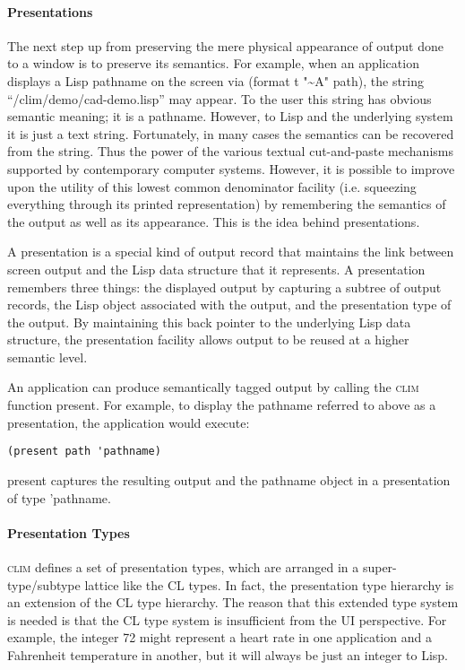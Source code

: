 \documentclass[twocolumn,a4paper]{article}
\newcommand {\code}[1]{{\sffamily #1}}
\newcommand {\CLIM}{\textsc{clim}}
\let\method\code
\begin{document}
\paragraph*{Presentations} The next step up from preserving the mere
physical appearance of output done to a window is to preserve its
semantics. For example, when an application displays a Lisp pathname
on the screen via \code{(format t "\~{}A" path)}, the string
``/clim/demo/cad-demo.lisp'' may appear. To the user this string has
obvious semantic meaning; it is a pathname. However, to Lisp and the
underlying system it is just a text string. Fortunately, in many cases
the semantics can be recovered from the string. Thus the power of the
various textual cut-and-paste mechanisms supported by contemporary
computer systems. However, it is possible to improve upon the utility
of this lowest common denominator facility (i.e.{} squeezing everything
through its printed representation) by remembering the semantics of
the output as well as its appearance. This is the idea behind
presentations.

A presentation is a special kind of output record that maintains the
link between screen output and the Lisp data structure that it
represents. A presentation remembers three things: the displayed
output by capturing a subtree of output records, the Lisp object
associated with the output, and the presentation type of the output.
By maintaining this back pointer to the underlying Lisp data
structure, the presentation facility allows output to be reused at a
higher semantic level.

An application can produce semantically tagged output by calling the
\CLIM{} function \method{present}. For example, to display the
pathname referred to above as a presentation, the application would
execute:
\begin{lstlisting}
(present path 'pathname)
\end{lstlisting}
\method{present} captures the resulting output and the pathname object
in a presentation of type \code{'pathname}.

\paragraph*{Presentation Types} \CLIM{} defines a set of presentation
types, which are arranged in a super-type/subtype lattice like the CL
types. In fact, the presentation type hierarchy is an extension of the
CL type hierarchy. The reason that this extended type system is needed
is that the CL type system is insufficient from the UI perspective. For
example, the integer 72 might represent a heart rate in one
application and a Fahrenheit temperature in another, but it will
always be just an integer to Lisp.
\end{document}

